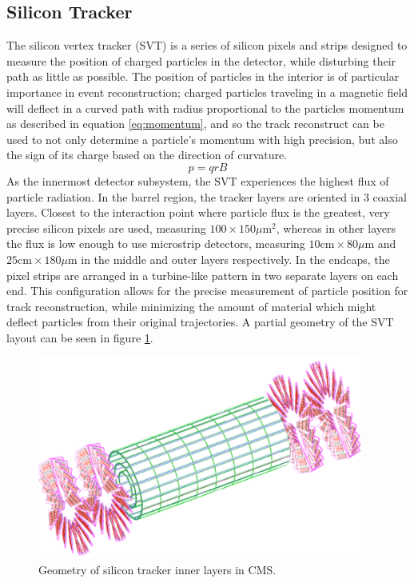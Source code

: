 \subsection{Silicon Tracker} 
\label{subsec:tracker}
The silicon vertex tracker (SVT) is a series of silicon pixels and strips designed to measure the position of charged particles in the detector, while disturbing their path as little as possible. The position of particles in the interior is of particular importance in event reconstruction; charged particles traveling in a magnetic field will deflect in a curved path with radius proportional to the particles momentum as described in equation \ref{eq:momentum}, and so the track reconstruct can be used to not only determine a particle's momentum with high precision, but also the sign of its charge based on the direction of curvature.
\begin{equation}
	\label{eq:momentum}
	p = qrB
\end{equation}
As the innermost detector subsystem, the SVT experiences the highest flux of particle radiation. In the barrel region, the tracker layers are oriented in 3 coaxial layers. Closest to the interaction point where particle flux is the greatest, very precise silicon pixels are used, measuring $100\times150 \mu \text{m}^2$, whereas in other layers the flux is low enough to use microstrip detectors, measuring $10 \text{cm}\times80\mu \text{m}$ and  $25 \text{cm}\times180\mu \text{m}$ in the middle and outer layers respectively. In the endcaps, the pixel strips are arranged in a turbine-like pattern in two separate layers on each end. This configuration allows for the precise measurement of particle position for track reconstruction, while minimizing the amount of material which might deflect particles from their original trajectories. A partial geometry of the SVT layout can be seen in figure \ref{fig:pixelLayout}.
\begin{figure}
	\centering
	\includegraphics[width=0.95\textwidth]{detector/figs/trackerGeometry}
	\caption{Geometry of silicon tracker inner layers in CMS.}
	\label{fig:pixelLayout}
\end{figure}

